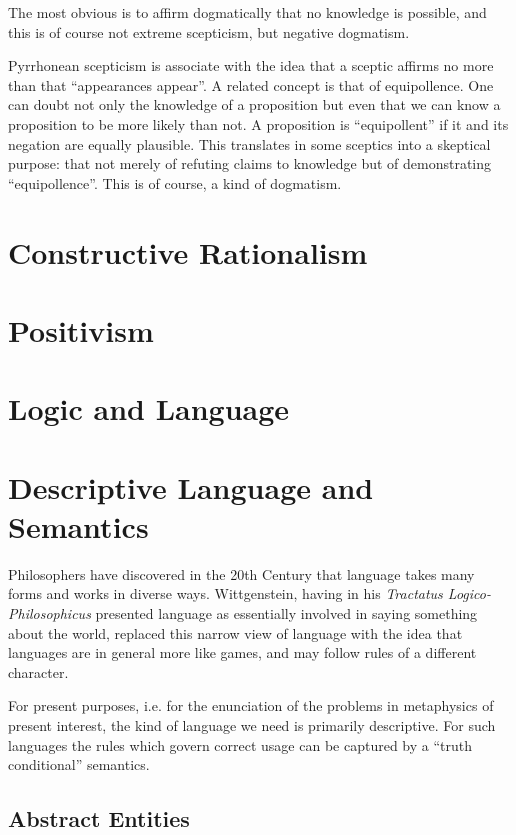 \documentclass{rbjk}
\begin{document}
\begin{article}
The most obvious is to affirm dogmatically that no knowledge is possible, and this is of course not extreme scepticism, but negative dogmatism.

Pyrrhonean scepticism is associate with the idea that a sceptic affirms no more than that ``appearances appear''.
A related concept is that of equipollence.
One can doubt not only the knowledge of a proposition but even that we can know a proposition to be more likely than not.
A proposition is ``equipollent'' if it and its negation are equally plausible.
This translates in some sceptics into a skeptical purpose: that not merely of refuting claims to knowledge but of demonstrating ``equipollence''.
This is of course, a kind of dogmatism.

\section{Constructive Rationalism}

\section{Positivism}

\section{Logic and Language}
\section{Descriptive Language and Semantics}

Philosophers have discovered in the 20th Century that language takes many forms and works in diverse ways.
Wittgenstein, having in his {\it Tractatus Logico-Philosophicus} presented language as essentially involved in saying something about the world, replaced this narrow view of language with the idea that languages are in general more like games, and may follow rules of a different character.

For present purposes, i.e. for the enunciation of the problems in metaphysics of present interest, the kind of language we need is primarily descriptive.
For such languages the rules which govern correct usage can be captured by a ``truth conditional'' semantics.

\subsection{Abstract Entities}


\end{article}
\end{document}

